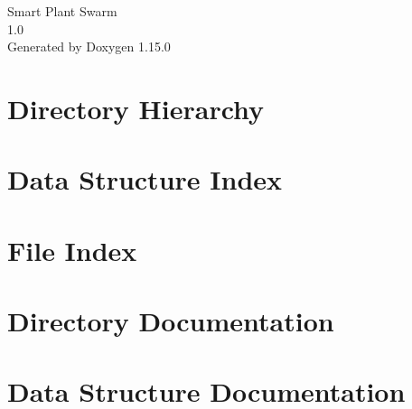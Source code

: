 \documentclass[twoside]{book}
\newcommand{\+}{\discretionary{\mbox{\scriptsize$\hookleftarrow$}}{}{}}
\newcommand{\clearemptydoublepage}{%
    \newpage{\pagestyle{empty}\cleardoublepage}%
  }
\begin{document}
  \raggedbottom
    \hypersetup{pageanchor=false,
                bookmarksnumbered=true,
                pdfencoding=unicode
               }
  \begin{titlepage}
  \vspace*{7cm}
  \begin{center}%
  {\Large Smart Plant Swarm}\\
  [1ex]\large 1.\+0 \\
  \vspace*{1cm}
  {\large Generated by Doxygen 1.15.0}\\
  \end{center}
  \end{titlepage}
  \clearemptydoublepage
  \tableofcontents
  \clearemptydoublepage
  \hypersetup{pageanchor=true}

\chapter{Directory Hierarchy}

\chapter{Data Structure Index}

\chapter{File Index}

\chapter{Directory Documentation}











\chapter{Data Structure Documentation}





\end{document}
